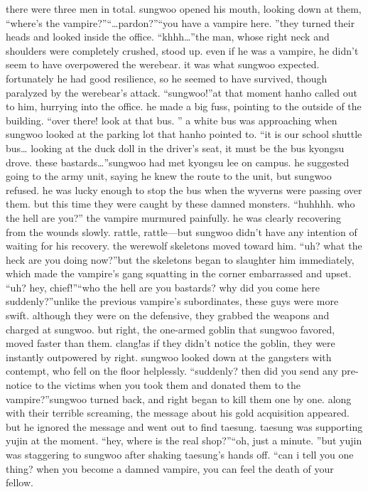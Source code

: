  there were three men in total.
 sungwoo opened his mouth, looking down at them, “where’s the vampire?”“…pardon?”“you have a vampire here.
”they turned their heads and looked inside the office.
“khhh…”the man, whose right neck and shoulders were completely crushed, stood up.
even if he was a vampire, he didn’t seem to have overpowered the werebear.
it was what sungwoo expected.
fortunately he had good resilience, so he seemed to have survived, though paralyzed by the werebear’s attack.
“sungwoo!”at that moment hanho called out to him, hurrying into the office.
he made a big fuss, pointing to the outside of the building.
“over there! look at that bus.
”
a white bus was approaching when sungwoo looked at the parking lot that hanho pointed to.
“it is our school shuttle bus… looking at the duck doll in the driver’s seat, it must be the bus kyongsu drove.
 these bastards…”sungwoo had met kyongsu lee on campus.
 he suggested going to the army unit, saying he knew the route to the unit, but sungwoo refused.
 he was lucky enough to stop the bus when the wyverns were passing over them.
 but this time they were caught by these damned monsters.
“huhhhh.
 who the hell are you?” the vampire murmured painfully.
 he was clearly recovering from the wounds slowly.
rattle, rattle—but sungwoo didn’t have any intention of waiting for his recovery.
the werewolf skeletons moved toward him.
“uh? what the heck are you doing now?”but the skeletons began to slaughter him immediately, which made the vampire’s gang squatting in the corner embarrassed and upset.
“uh? hey, chief!”“who the hell are you bastards? why did you come here suddenly?”unlike the previous vampire’s subordinates, these guys were more swift.
 although they were on the defensive, they grabbed the weapons and charged at sungwoo.
but right, the one-armed goblin that sungwoo favored, moved faster than them.
clang!as if they didn’t notice the goblin, they were instantly outpowered by right.
sungwoo looked down at the gangsters with contempt, who fell on the floor helplessly.
“suddenly? then did you send any pre-notice to the victims when you took them and donated them to the vampire?”sungwoo turned back, and right began to kill them one by one.
along with their terrible screaming, the message about his gold acquisition appeared.
but he ignored the message and went out to find taesung.
taesung was supporting yujin at the moment.
“hey, where is the real shop?”“oh, just a minute.
”but yujin was staggering to sungwoo after shaking taesung’s hands off.
“can i tell you one thing? when you become a damned vampire, you can feel the death of your fellow.
